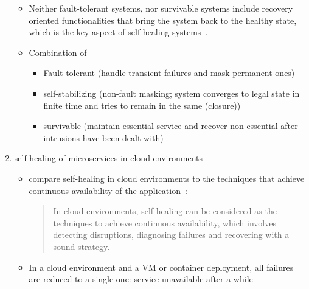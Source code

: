 \begin{enumerate}
\begin{itemize}
    \item Neither fault-tolerant systems, nor survivable systems include recovery oriented functionalities that bring the system back to the healthy state, which is the key aspect of self-healing systems~\cite{Ghosh}.    
    \item Combination of~\cite{PsaierSurvey}
    \begin{itemize}
      \item Fault-tolerant (handle transient failures and mask permanent ones)
      \item self-stabilizing (non-fault masking; system converges to legal state in finite time and tries to remain in the same (closure))
      \item survivable (maintain essential service and recover non-essential after intrusions have been dealt with)
    \end{itemize}
  \end{itemize}
  
  \item self-healing of microservices in cloud environments
  \begin{itemize}
    \item \citeauthor{PsaierSurvey} compare self-healing in cloud environments to the techniques that achieve continuous availability of the application~\cite{PsaierSurvey}:
    \begin{quote}
      In cloud environments, self-healing can be considered as the techniques to achieve continuous availability, which involves detecting disruptions, diagnosing failures and recovering with a sound strategy.
    \end{quote}
    \item In a cloud environment and a VM or container deployment, all failures are reduced to a single one: service unavailable after a while
  \end{itemize}
\end{enumerate}